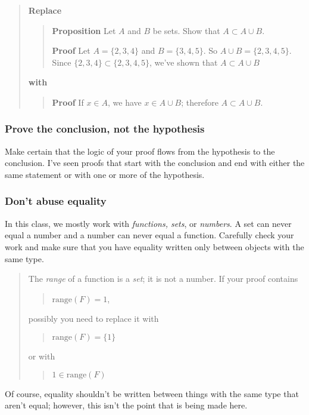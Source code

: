 \documentclass[12pt]{article}
\newcounter{ex}\setcounter{ex}{0}
\newcounter{se}\setcounter{se}{0}
\begin{document}
\begin{quote}
\textbf{\textbf{Replace}}
\begin{quote}
 \textbf {Proposition} Let \(A\) and \(B\) be sets.  Show that 
\(A \subset A \cup B\).

\vspace{0.1in}

\textbf{Proof} Let \(A = \{2,3,4\}\) and \(B = \{3,4,5\}\).  So
\mbox{\(A \cup B = \{2,3,4,5\}\)}.  Since \(\{2,3,4\} \subset \{2,3,4,5\}\),
we've shown that \(A \subset A \cup B\)
\end{quote}
\textbf{with}
\begin{quote}
 \textbf {Proof}  If \(x \in A\), we have \(x \in A \cup B\); therefore
\(A \subset A \cup B\).
\end{quote}
\end{quote}

 \subsubsection{ Prove the conclusion, not the hypothesis}

Make certain that the logic of your proof flows from the 
hypothesis to the conclusion. I've seen proofs that
start with the conclusion and end with either the same statement
or with one or more of the hypothesis.  



 \subsubsection{Don't abuse equality}

In this class, we mostly work with {\em functions, sets}, or {\em
numbers\/}.  A set can never equal a number and a number can never
equal a function.  Carefully check your work and make sure that you
have equality written only between objects with the same type.
\begin{quote}
The \emph{range} of a function is a \emph{set}; it is not a
number. If your proof contains
\begin{quote}
 \(\mbox{range}(F) = 1\),
\end{quote}
possibly you need to replace it with
\begin{quote}
 \(\mbox{range}(F) = \{1\}\)
\end{quote}
or with
\begin{quote}
 \(1 \in \mbox{range}(F)\)
\end{quote}
\end{quote}
Of course, equality shouldn't be written between things with the
same type that aren't equal; however, this isn't the point that 
is being made here.
\end{document}
